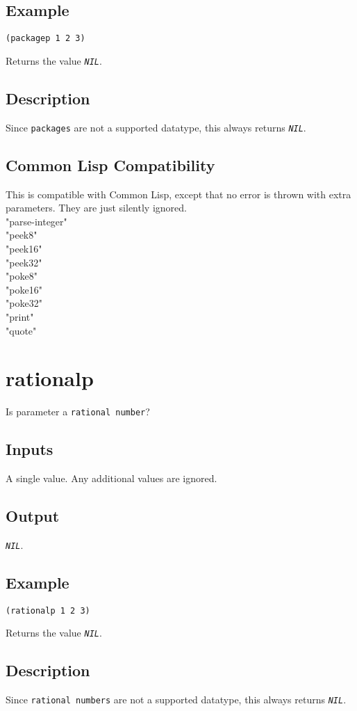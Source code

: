 \documentclass[10pt, openany]{book}
\newcommand{\constant}[1]{\emph{\texttt{#1}}}
\newcommand{\datatype}[1]{\texttt{#1}}
\newcommand{\cl}{Common Lisp}
\begin{document}
\subsection{Example}
\begin{lstlisting}
(packagep 1 2 3)
\end{lstlisting}
Returns the value \constant{NIL}.
\subsection{Description}
Since \datatype{packages} are not a supported datatype, this always returns \constant{NIL}.
\subsection{Common Lisp Compatibility}
This is compatible with \cl, except that no error is thrown with extra parameters.  They are just silently ignored.
\\
      "parse-integer"\\
      "peek8"\\
      "peek16"\\
      "peek32"\\
      "poke8"\\
      "poke16"\\
      "poke32"\\
      "print"\\
      "quote"\\

\section{rationalp}
Is parameter a \datatype{rational number}?
\subsection{Inputs}
A single value.  Any additional values are ignored.
\subsection{Output}
\constant{NIL}.
\subsection{Example}
\begin{lstlisting}
(rationalp 1 2 3)
\end{lstlisting}
Returns the value \constant{NIL}.
\subsection{Description}
Since \datatype{rational numbers} are not a supported datatype, this always returns \constant{NIL}.
\end{document}
